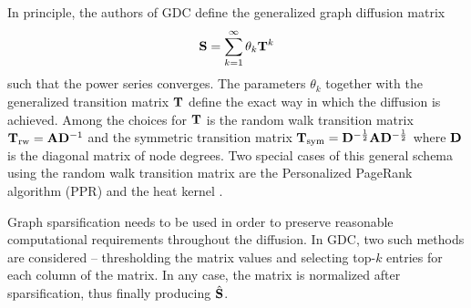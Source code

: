 In principle, the authors of GDC define the generalized graph diffusion matrix
\begin{equation}\label{eq:gdc-matrix}
    \mathbf{S} = \sum_{k = 1}^\infty \theta_k \mathbf{T}^k
\end{equation}
such that the power series converges. The parameters \( \theta_k \) together with the generalized transition matrix \( \mathbf{T} \) define the exact way in which the diffusion is achieved. Among the choices for \( \mathbf{T} \) is the random walk transition matrix \( \mathbf{T}_ \mathrm{rw} = \mathbf{A} \mathbf{D}^{-1} \) and the symmetric transition matrix \( \mathbf{T}_\mathrm{sym} = \mathbf{D}^{-\frac{1}{2}} \mathbf{A} \mathbf{D}^{-\frac{1}{2}} \) where \( \mathbf{D} \) is the diagonal matrix of node degrees. Two special cases of this general schema using the random walk transition matrix are the Personalized PageRank algorithm (PPR) \cite{page_pagerank_1999} and the heat kernel \cite{kondor_diffusion_2002}.

Graph sparsification needs to be used in order to preserve reasonable computational requirements throughout the diffusion. In GDC, two such methods are considered -- thresholding the matrix values and selecting top-\( k \) entries for each column of the matrix. In any case, the matrix is normalized after sparsification, thus finally producing \( \hat{\mathbf{S}} \).

